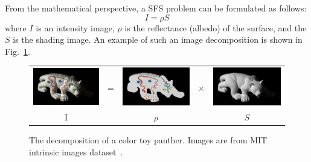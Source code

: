 From the mathematical perspective, a SFS problem can be formulated as follows:
\begin{equation}\label{eq:sfs_equation}
    I = \rho S
\end{equation}
where $I$ is an intensity image, $\rho$ is the reflectance (albedo) of the surface, and the $S$ is the shading image. 
An example of such an image decomposition is shown in Fig.~\ref{fig:shading}.
\begin{figure}[!htbp]
\centering
\setlength{\tabcolsep}{0.1em} %
 {\renewcommand{\arraystretch}{0.6}%
\begin{tabular}{c c c c c}
   \includegraphics[height = 0.16\linewidth]{figures/panther_rgb.pdf} \hspace{0.05cm}   &
   \multirow{-10}{*}{\parbox[t]{3.5mm}{=}}  & 
   \includegraphics[height = 0.16\linewidth]{figures/panther_rho.pdf} &
    \multirow{-10}{*}{\parbox[t]{3.5mm}{$\times$}}  & 
   \includegraphics[height = 0.16\linewidth]{figures/panther_shade.pdf} \\
      {I} &{} &{$\rho$} & {}& {$S$}            
 \end{tabular}}
\caption{The decomposition of a color toy panther. Images are from MIT intrinsic images dataset~\cite{grosse2009ground}.}
\label{fig:shading}
\end{figure}

